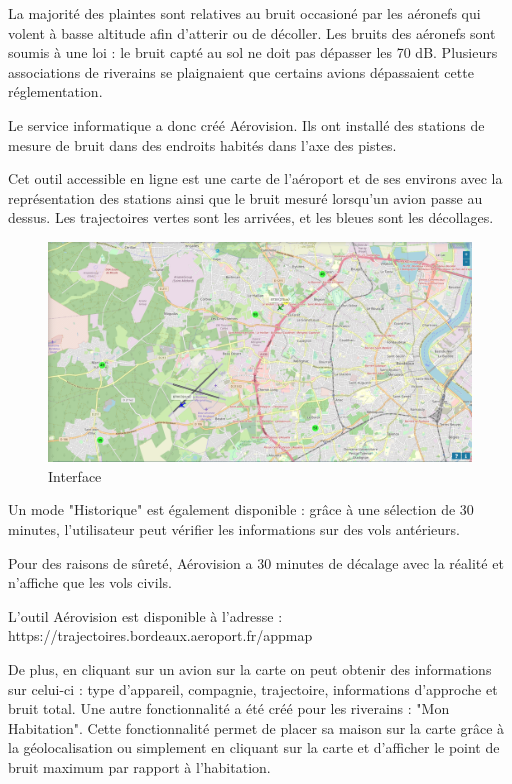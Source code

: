 La majorité des plaintes sont relatives au bruit occasioné par les aéronefs qui volent à basse altitude afin d'atterir ou de décoller.
Les bruits des aéronefs sont soumis à une loi : le bruit capté au sol ne doit pas dépasser les 70 dB. Plusieurs associations de riverains se plaignaient que certains avions dépassaient cette réglementation.\newline

Le service informatique a donc créé Aérovision. Ils ont installé des stations de mesure de bruit dans des endroits habités dans l'axe des pistes.


Cet outil accessible en ligne est une carte de l'aéroport et de ses environs avec la représentation des stations ainsi que le bruit mesuré lorsqu'un avion passe au dessus. Les trajectoires vertes sont les arrivées, et les bleues sont les décollages.

\begin{figure}[hbt!]
  \centering
  \includegraphics[width=17cm]{Images/aerovision.png}\newline
  \caption{Interface}
  \label{fig:interfaceaerovision}
\end{figure}

\newpage
Un mode "Historique" est également disponible : grâce à une sélection de 30 minutes, l'utilisateur peut vérifier les informations sur des vols antérieurs.

Pour des raisons de sûreté, Aérovision a 30 minutes de décalage avec la réalité et n'affiche que les vols civils.

L'outil Aérovision est disponible à l'adresse : https://trajectoires.bordeaux.aeroport.fr/appmap\newline

De plus, en cliquant sur un avion sur la carte on peut obtenir des informations sur celui-ci : type d'appareil, compagnie, trajectoire, informations d'approche et bruit total.
Une autre fonctionnalité a été créé pour les riverains : "Mon Habitation". Cette fonctionnalité permet de placer sa maison sur la carte grâce à la géolocalisation ou simplement en cliquant sur la carte et d'afficher le point de bruit maximum par rapport à l'habitation.

